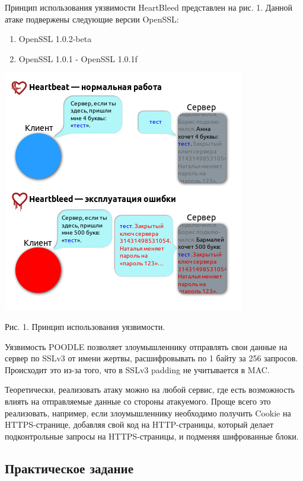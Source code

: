 \documentclass{article}
\begin{document}
Принцип использования уязвимости HeartBleed представлен на рис. 1. Данной атаке подвержены следующие версии OpenSSL:
\begin{enumerate}
\item OpenSSL 1.0.2-beta
\item OpenSSL 1.0.1 - OpenSSL 1.0.1f
\end{enumerate}
\includegraphics[width=\linewidth]{heartbleed}
\begin{center}
Рис. 1. Принцип использования уязвимости.
\end{center}

Уязвимость POODLE позволяет злоумышленнику отправлять свои данные на сервер по SSLv3 от имени жертвы, расшифровывать по 1 байту за 256 запросов. Происходит это из-за того, что в SSLv3 padding не учитывается в MAC. 

Теоретически, реализовать атаку можно на любой сервис, где есть возможность влиять на отправляемые данные со стороны атакуемого. Проще всего это реализовать, например, если злоумышленнику необходимо получить Cookie на HTTPS-странице, добавляя свой код на HTTP-страницы, который делает подконтрольные запросы на HTTPS-страницы, и подменяя шифрованные блоки.

\subsection{Практическое задание}
\end{document}
